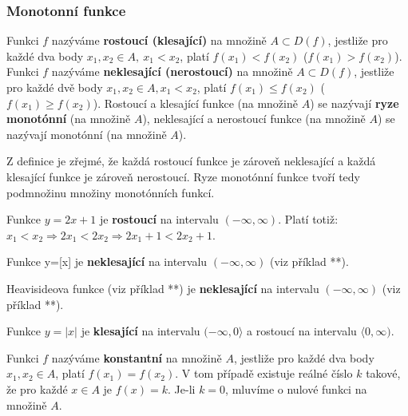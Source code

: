 {      %
        
       
      \subsubsection{Monotonní funkce}
        \begin{definition}\label{MA1:def_lim02}
          Funkci $f$ nazýváme \textbf{rostoucí (klesající)} na množině $A\subset D(f)$, jestliže 
          pro každé dva body $x_1, x_2\in A,\ x_1<x_2$, platí $f(x_1)<f(x_2)$ ($f(x_1)>f(x_2)$). 
          Funkci $f$ nazýváme \textbf{neklesající (nerostoucí)} na množině $A\subset D(f)$, 
          jestliže pro každé dvě body $x_1, x_2\in A,x_1<x_2$, platí $f(x_1)\leq f(x_2)$ 
          ($f(x_1)\geq f(x_2)$). Rostoucí a klesající funkce (na množině $A$) se nazývají 
          \textbf{ryze monotónní} (na množině $A$), neklesající a nerostoucí funkce (na množině 
          $A$) se nazývají monotónní (na množině $A$).    
        \end{definition}
            
        Z definice je zřejmé, že každá rostoucí funkce je zároveň neklesající a každá klesající 
        funkce je zároveň nerostoucí. Ryze monotónní funkce tvoří tedy podmnožinu množiny 
        monotónních funkcí. 
           
        \begin{example}
          Funkce $y=2x+1$ je \textbf{rostoucí} na intervalu $(-\infty, \infty)$. Platí totiž: $x_1<x_2\Rightarrow 2x_1<2x_2\Rightarrow2x_1+1<2x_2+1$.
        \end{example}
        \begin{example}
          Funkce y=[x] je \textbf{neklesající} na intervalu $(-\infty, \infty)$ (viz příklad **). 
        \end{example}
        \begin{example}
          Heavisideova funkce (viz příklad **) je \textbf{neklesající} na intervalu $(-\infty, \infty)$ (viz příklad **). 
        \end{example}       
        \begin{example}
          Funkce $y=|x|$ je \textbf{klesající} na intervalu $(-\infty, 0\rangle$ a rostoucí na intervalu $\langle0, \infty)$. 
        \end{example}  
            
        \begin{definition}\label{MA1:def_lim03}
          Funkci $f$ nazýváme \textbf{konstantní} na množině $A$, jestliže pro každé dva body $x_1, 
          x_2\in A$, platí $f(x_1)=f(x_2)$. V tom případě existuje reálné číslo $k$ takové, že pro 
          každé $x\in A$ je $f(x)=k$. Je-li $k=0$, mluvíme o nulové funkci na množině $A$. 
        \end{definition} 
          
}
